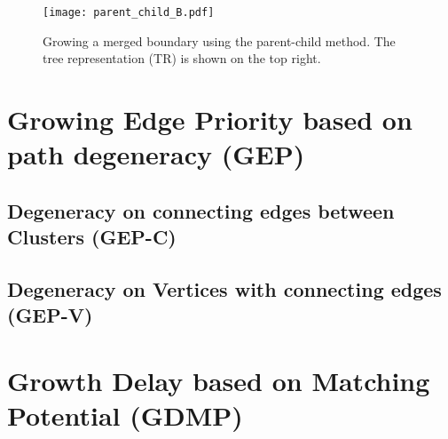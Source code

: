 \begin{figure}
  \centering
  \texttt{[image: parent\_child\_B.pdf]}
  \caption{Growing a merged boundary using the parent-child method. The tree representation (TR) is shown on the top right. }\label{3.fig.parentchildB}
\end{figure}


\section{Growing Edge Priority based on path degeneracy (GEP)} 

\subsection{Degeneracy on connecting edges between Clusters (GEP-C)}
\subsection{Degeneracy on Vertices with connecting edges (GEP-V)}

\section{Growth Delay based on Matching Potential (GDMP)}









